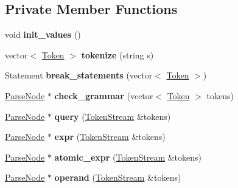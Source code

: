 \subsection*{Private Member Functions}
\begin{DoxyCompactItemize}
\item 
\hypertarget{class_parser_ac96b9afc820eaef9a480f4048c6a8828}{void {\bfseries init\-\_\-values} ()}\label{class_parser_ac96b9afc820eaef9a480f4048c6a8828}

\item 
\hypertarget{class_parser_aacfcfb3cafc88f6389eb0f8bc09a2d0d}{vector$<$ \hyperlink{struct_token}{Token} $>$ {\bfseries tokenize} (string s)}\label{class_parser_aacfcfb3cafc88f6389eb0f8bc09a2d0d}

\item 
\hypertarget{class_parser_a9c573337bd17fd450e5dedbf776c4171}{Statement {\bfseries break\-\_\-statements} (vector$<$ \hyperlink{struct_token}{Token} $>$)}\label{class_parser_a9c573337bd17fd450e5dedbf776c4171}

\item 
\hypertarget{class_parser_a65ff44533bc25f4d3f4f7365fa776fa1}{\hyperlink{struct_parse_node}{Parse\-Node} $\ast$ {\bfseries check\-\_\-grammar} (vector$<$ \hyperlink{struct_token}{Token} $>$ tokens)}\label{class_parser_a65ff44533bc25f4d3f4f7365fa776fa1}

\item 
\hypertarget{class_parser_a0c65f050142923184cb56372614f5221}{\hyperlink{struct_parse_node}{Parse\-Node} $\ast$ {\bfseries query} (\hyperlink{class_token_stream}{Token\-Stream} \&tokens)}\label{class_parser_a0c65f050142923184cb56372614f5221}

\item 
\hypertarget{class_parser_a0eb3710e8ddf53bf91ef1341338802fa}{\hyperlink{struct_parse_node}{Parse\-Node} $\ast$ {\bfseries expr} (\hyperlink{class_token_stream}{Token\-Stream} \&tokens)}\label{class_parser_a0eb3710e8ddf53bf91ef1341338802fa}

\item 
\hypertarget{class_parser_a1dd01c414355cc51537fd5a019d1957e}{\hyperlink{struct_parse_node}{Parse\-Node} $\ast$ {\bfseries atomic\-\_\-expr} (\hyperlink{class_token_stream}{Token\-Stream} \&tokens)}\label{class_parser_a1dd01c414355cc51537fd5a019d1957e}

\item 
\hypertarget{class_parser_af13706aef97f6d8e918024b2bd902e96}{\hyperlink{struct_parse_node}{Parse\-Node} $\ast$ {\bfseries operand} (\hyperlink{class_token_stream}{Token\-Stream} \&tokens)}\label{class_parser_af13706aef97f6d8e918024b2bd902e96}


\end{DoxyCompactItemize}

